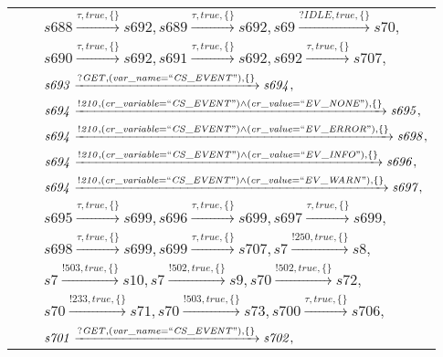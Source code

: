 \begin{tabular}{lcl}
& & $\mathit{s688}\xrightarrow{\mathit{\tau}, \mathit{true}, \{\}}\mathit{s692},\mathit{s689}\xrightarrow{\mathit{\tau}, \mathit{true}, \{\}}\mathit{s692},\mathit{s69}\xrightarrow{\mathit{?IDLE}, \mathit{true}, \{\}}\mathit{s70},$ \\
& & $\mathit{s690}\xrightarrow{\mathit{\tau}, \mathit{true}, \{\}}\mathit{s692},\mathit{s691}\xrightarrow{\mathit{\tau}, \mathit{true}, \{\}}\mathit{s692},\mathit{s692}\xrightarrow{\mathit{\tau}, \mathit{true}, \{\}}\mathit{s707},$ \\
& & $\mathit{s693}\xrightarrow{\mathit{?GET}, \mathit{(var\_name = ``CS\_EVENT")}, \{\}}\mathit{s694},$ \\
& & $\mathit{s694}\xrightarrow{\mathit{!210}, \mathit{(cr\_variable = ``CS\_EVENT") \land (cr\_value = ``EV\_NONE")}, \{\}}\mathit{s695},$ \\
& & $\mathit{s694}\xrightarrow{\mathit{!210}, \mathit{(cr\_variable = ``CS\_EVENT") \land (cr\_value = ``EV\_ERROR")}, \{\}}\mathit{s698},$ \\
& & $\mathit{s694}\xrightarrow{\mathit{!210}, \mathit{(cr\_variable = ``CS\_EVENT") \land (cr\_value = ``EV\_INFO")}, \{\}}\mathit{s696},$ \\
& & $\mathit{s694}\xrightarrow{\mathit{!210}, \mathit{(cr\_variable = ``CS\_EVENT") \land (cr\_value = ``EV\_WARN")}, \{\}}\mathit{s697},$ \\
& & $\mathit{s695}\xrightarrow{\mathit{\tau}, \mathit{true}, \{\}}\mathit{s699},\mathit{s696}\xrightarrow{\mathit{\tau}, \mathit{true}, \{\}}\mathit{s699},\mathit{s697}\xrightarrow{\mathit{\tau}, \mathit{true}, \{\}}\mathit{s699},$ \\
& & $\mathit{s698}\xrightarrow{\mathit{\tau}, \mathit{true}, \{\}}\mathit{s699},\mathit{s699}\xrightarrow{\mathit{\tau}, \mathit{true}, \{\}}\mathit{s707},\mathit{s7}\xrightarrow{\mathit{!250}, \mathit{true}, \{\}}\mathit{s8},$ \\
& & $\mathit{s7}\xrightarrow{\mathit{!503}, \mathit{true}, \{\}}\mathit{s10},\mathit{s7}\xrightarrow{\mathit{!502}, \mathit{true}, \{\}}\mathit{s9},\mathit{s70}\xrightarrow{\mathit{!502}, \mathit{true}, \{\}}\mathit{s72},$ \\
& & $\mathit{s70}\xrightarrow{\mathit{!233}, \mathit{true}, \{\}}\mathit{s71},\mathit{s70}\xrightarrow{\mathit{!503}, \mathit{true}, \{\}}\mathit{s73},\mathit{s700}\xrightarrow{\mathit{\tau}, \mathit{true}, \{\}}\mathit{s706},$ \\
& & $\mathit{s701}\xrightarrow{\mathit{?GET}, \mathit{(var\_name = ``CS\_EVENT")}, \{\}}\mathit{s702},$ \\

\end{tabular}
